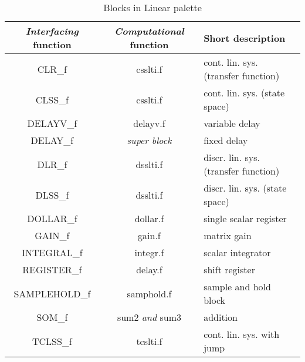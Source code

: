 \documentclass{book}
\newcommand{\computational}{{\em Computational }}
\newcommand{\interfacing}{{\em Interfacing }}
\begin{document}
\begin{table}[ht]
\begin{center}
\begin{tabular}{|c|c|l|} \hline
\interfacing function&\computational function&Short description\\
\hline
CLR\_f&  csslti.f         & cont. lin. sys. (transfer function)           \\
CLSS\_f& csslti.f          & cont. lin. sys. (state space)            \\
DELAYV\_f&delayv.f           & variable delay           \\
DELAY\_f& {\em super block}          & fixed delay           \\
DLR\_f&   dsslti.f        &  discr. lin. sys. (transfer function)          \\
DLSS\_f&  dsslti.f         &  discr. lin. sys. (state space)            \\
DOLLAR\_f& dollar.f              & single scalar register               \\
GAIN\_f&  gain.f         &   matrix gain         \\
INTEGRAL\_f&  integr.f         &   scalar integrator         \\
REGISTER\_f& delay.f          &   shift register         \\
SAMPLEHOLD\_f& samphold.f          &   sample and hold block         \\
SOM\_f& sum2 {\em and} sum3          &  addition          \\
TCLSS\_f&tcslti.f           & cont. lin. sys. with jump           \\ \hline
\end{tabular}
\end{center}
\caption{Blocks in Linear palette}
\end{table}
\end{document}
